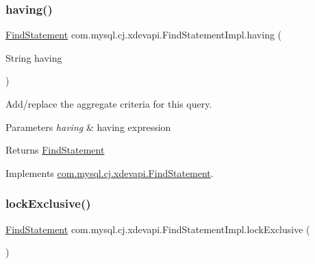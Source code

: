 \mbox{\label{classcom_1_1mysql_1_1cj_1_1xdevapi_1_1_find_statement_impl_aa5772a01729fde08c5959498e56b5448}} 
\subsubsection{\texorpdfstring{having()}{having()}}
{\footnotesize\ttfamily \mbox{\hyperlink{interfacecom_1_1mysql_1_1cj_1_1xdevapi_1_1_find_statement}{Find\+Statement}} com.\+mysql.\+cj.\+xdevapi.\+Find\+Statement\+Impl.\+having (\begin{DoxyParamCaption}\item[{String}]{having }\end{DoxyParamCaption})}

Add/replace the aggregate criteria for this query.


\begin{DoxyParams}{Parameters}
{\em having} & having expression \\
\hline
\end{DoxyParams}
\begin{DoxyReturn}{Returns}
\mbox{\hyperlink{interfacecom_1_1mysql_1_1cj_1_1xdevapi_1_1_find_statement}{Find\+Statement}} 
\end{DoxyReturn}


Implements \mbox{\hyperlink{interfacecom_1_1mysql_1_1cj_1_1xdevapi_1_1_find_statement_af151c43e0c862bd983c6c737320a6a5f}{com.\+mysql.\+cj.\+xdevapi.\+Find\+Statement}}.

\mbox{\label{classcom_1_1mysql_1_1cj_1_1xdevapi_1_1_find_statement_impl_a3486c67a7e4b354ff3101b9c5734c5f1}} 
\subsubsection{\texorpdfstring{lock\+Exclusive()}{lockExclusive()}\hspace{0.1cm}{\footnotesize\ttfamily [1/2]}}
{\footnotesize\ttfamily \mbox{\hyperlink{interfacecom_1_1mysql_1_1cj_1_1xdevapi_1_1_find_statement}{Find\+Statement}} com.\+mysql.\+cj.\+xdevapi.\+Find\+Statement\+Impl.\+lock\+Exclusive (\begin{DoxyParamCaption}{ }\end{DoxyParamCaption})}

